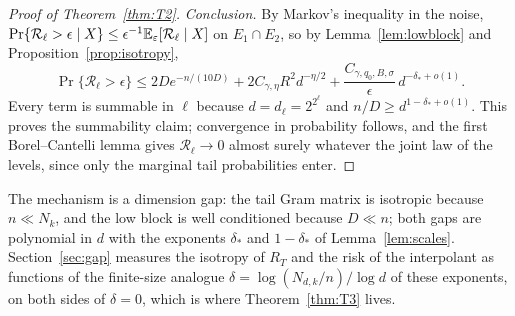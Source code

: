\begin{proof}[Proof of Theorem~\ref{thm:T2}]
\emph{Conclusion.} By Markov's inequality in the noise, $\Pr\{\mathcal R_\ell>\epsilon\mid X\}\le\epsilon^{-1}\mathbb{E}_\varepsilon[\mathcal R_\ell\mid X]$
on $E_1\cap E_2$, so by Lemma~\ref{lem:lowblock} and Proposition~\ref{prop:isotropy},
\[
\Pr\{\mathcal R_\ell>\epsilon\}\le2De^{-n/(10D)}+2C_{\gamma,\eta}R^2d^{-\eta/2}+\frac{C_{\gamma,q_0,B,\sigma}}{\epsilon}\,d^{-\delta_*+o(1)} .
\]
Every term is summable in $\ell$ because $d=d_\ell=2^{2^\ell}$ and $n/D\ge d^{1-\delta_*+o(1)}$. This proves
the summability claim; convergence in probability follows, and the first Borel--Cantelli lemma gives
$\mathcal R_\ell\to0$ almost surely whatever the joint law of the levels, since only the marginal tail
probabilities enter.
\end{proof}

\begin{remark}\label{rem:T2numerics}
The mechanism is a dimension gap: the tail Gram matrix is isotropic because $n\ll N_k$, and the low block is
well conditioned because $D\ll n$; both gaps are polynomial in $d$ with the exponents $\delta_*$ and
$1-\delta_*$ of Lemma~\ref{lem:scales}. Section~\ref{sec:gap} measures the isotropy of $R_T$ and the risk of
the interpolant as functions of the finite-size analogue $\delta=\log(N_{d,k}/n)/\log d$ of these exponents,
on both sides of $\delta=0$, which is where Theorem~\ref{thm:T3} lives.
\end{remark}
